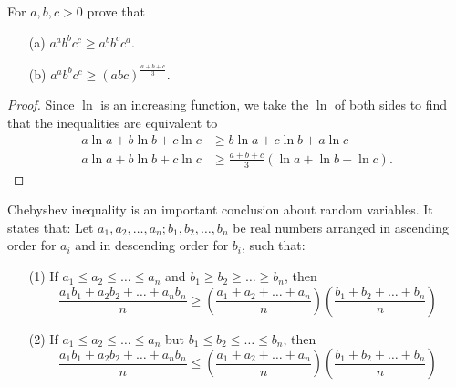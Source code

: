 \documentclass[
	12pt, %
	fleqn, %
	a4paper, %
]{LegrandOrangeBook}
\begin{document}
\begin{exercise}
    For $a, b, c > 0$ prove that
    \begin{enumerate}
        \item[(a)] \(a^{a}b^{b}c^{c} \geq a^{b}b^{c}c^{a}\).
        \item[(b)] \(a^{a}b^{b}c^{c} \geq (abc)^{\frac{a+b+c}{3}}\).
    \end{enumerate}
\end{exercise}
\begin{proof}
    Since \(\ln\) is an increasing function, we take the \(\ln\) of both sides to find that the inequalities are equivalent to
\begin{align*}
    a\ln a + b\ln b + c\ln c &\geq b\ln a + c\ln b + a\ln c \\
    a\ln a + b\ln b + c\ln c &\geq \frac{a+b+c}{3}(\ln a + \ln b + \ln c).
\end{align*}
\end{proof}
\begin{exercise}
    Chebyshev inequality is an important conclusion about random variables. It states that:
    Let \( a_1, a_2, \ldots, a_n; b_1, b_2, \ldots, b_n \) be real numbers arranged in ascending order for \( a_i \) and in descending order for \( b_i \), such that:

\begin{enumerate}
    \item[(1)] If \( a_1 \leq a_2 \leq \ldots \leq a_n \) and \( b_1 \geq b_2 \geq \ldots \geq b_n \), then
    \[ \frac{a_1b_1 + a_2b_2 + \ldots + a_nb_n}{n} \geq \left( \frac{a_1 + a_2 + \ldots + a_n}{n} \right)\left( \frac{b_1 + b_2 + \ldots + b_n}{n} \right) \]

    \item[(2)] If \( a_1 \leq a_2 \leq \ldots \leq a_n \) but \( b_1 \leq b_2 \leq \ldots \leq b_n \), then
    \[ \frac{a_1b_1 + a_2b_2 + \ldots + a_nb_n}{n} \leq \left( \frac{a_1 + a_2 + \ldots + a_n}{n} \right)\left( \frac{b_1 + b_2 + \ldots + b_n}{n} \right) \]
\end{enumerate}
\end{exercise}
\end{document}
